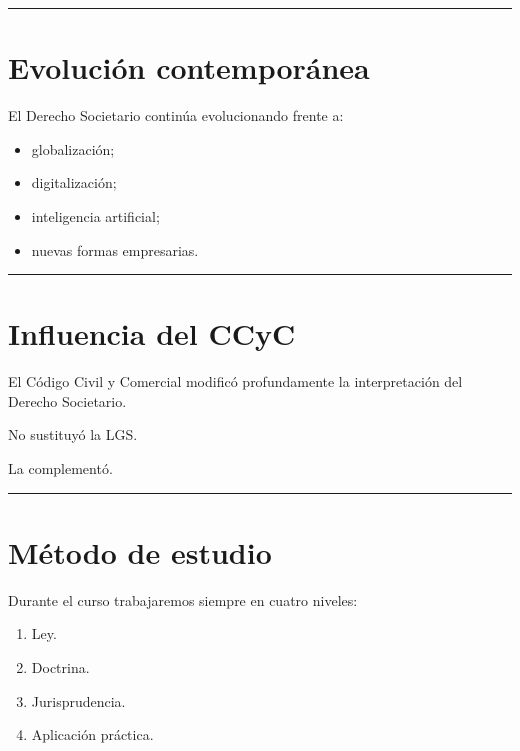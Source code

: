 \documentclass[
  spanish,
  letterpaper,
  DIV=11,
  numbers=noendperiod]{scrartcl}
\providecommand{\tightlist}{%
  \setlength{\itemsep}{0pt}\setlength{\parskip}{0pt}}
\begin{document}
\begin{center}\rule{0.5\linewidth}{0.5pt}\end{center}

\section{Evolución contemporánea}\label{evoluciuxf3n-contemporuxe1nea}

El Derecho Societario continúa evolucionando frente a:

\begin{itemize}
\tightlist
\item
  globalización;
\item
  digitalización;
\item
  inteligencia artificial;
\item
  nuevas formas empresarias.
\end{itemize}

\begin{center}\rule{0.5\linewidth}{0.5pt}\end{center}

\section{Influencia del CCyC}\label{influencia-del-ccyc}

El Código Civil y Comercial modificó profundamente la interpretación del
Derecho Societario.

No sustituyó la LGS.

La complementó.

\begin{center}\rule{0.5\linewidth}{0.5pt}\end{center}

\section{Método de estudio}\label{muxe9todo-de-estudio}

Durante el curso trabajaremos siempre en cuatro niveles:

\begin{enumerate}
\def\labelenumi{\arabic{enumi}.}
\tightlist
\item
  Ley.
\item
  Doctrina.
\item
  Jurisprudencia.
\item
  Aplicación práctica.
\end{enumerate}
\end{document}
